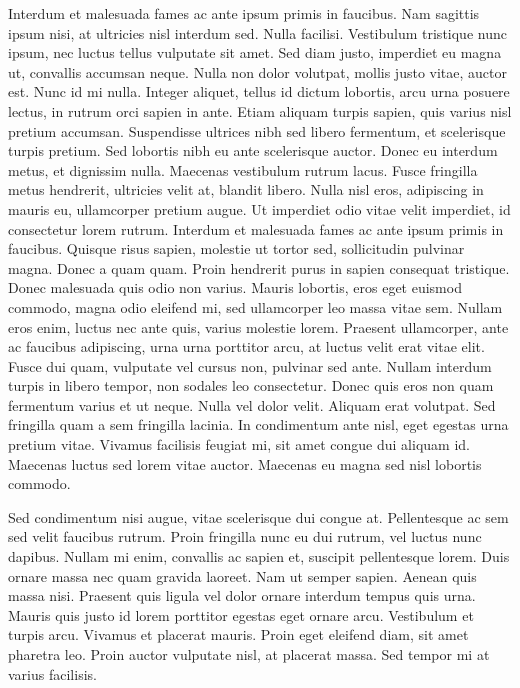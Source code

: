 \documentclass[a4paper, 12pt, twoside]{book}
\begin{document}

Interdum et malesuada fames ac ante ipsum primis in faucibus. Nam sagittis ipsum nisi, at ultricies nisl interdum sed. Nulla facilisi. Vestibulum tristique nunc ipsum, nec luctus tellus vulputate sit amet. Sed diam justo, imperdiet eu magna ut, convallis accumsan neque. Nulla non dolor volutpat, mollis justo vitae, auctor est. Nunc id mi nulla. Integer aliquet, tellus id dictum lobortis, arcu urna posuere lectus, in rutrum orci sapien in ante. Etiam aliquam turpis sapien, quis varius nisl pretium accumsan. Suspendisse ultrices nibh sed libero fermentum, et scelerisque turpis pretium. Sed lobortis nibh eu ante scelerisque auctor. Donec eu interdum metus, et dignissim nulla. Maecenas vestibulum rutrum lacus. Fusce fringilla metus hendrerit, ultricies velit at, blandit libero. Nulla nisl eros, adipiscing in mauris eu, ullamcorper pretium augue. Ut imperdiet odio vitae velit imperdiet, id consectetur lorem rutrum. Interdum et malesuada fames ac ante ipsum primis in faucibus. Quisque risus sapien, molestie ut tortor sed, sollicitudin pulvinar magna. Donec a quam quam. Proin hendrerit purus in sapien consequat tristique. Donec malesuada quis odio non varius. Mauris lobortis, eros eget euismod commodo, magna odio eleifend mi, sed ullamcorper leo massa vitae sem. Nullam eros enim, luctus nec ante quis, varius molestie lorem. Praesent ullamcorper, ante ac faucibus adipiscing, urna urna porttitor arcu, at luctus velit erat vitae elit. Fusce dui quam, vulputate vel cursus non, pulvinar sed ante. Nullam interdum turpis in libero tempor, non sodales leo consectetur. Donec quis eros non quam fermentum varius et ut neque. Nulla vel dolor velit. Aliquam erat volutpat. Sed fringilla quam a sem fringilla lacinia. In condimentum ante nisl, eget egestas urna pretium vitae. Vivamus facilisis feugiat mi, sit amet congue dui aliquam id. Maecenas luctus sed lorem vitae auctor. Maecenas eu magna sed nisl lobortis commodo.

Sed condimentum nisi augue, vitae scelerisque dui congue at. Pellentesque ac sem sed velit faucibus rutrum. Proin fringilla nunc eu dui rutrum, vel luctus nunc dapibus. Nullam mi enim, convallis ac sapien et, suscipit pellentesque lorem. Duis ornare massa nec quam gravida laoreet. Nam ut semper sapien. Aenean quis massa nisi. Praesent quis ligula vel dolor ornare interdum tempus quis urna. Mauris quis justo id lorem porttitor egestas eget ornare arcu. Vestibulum et turpis arcu. Vivamus et placerat mauris. Proin eget eleifend diam, sit amet pharetra leo. Proin auctor vulputate nisl, at placerat massa. Sed tempor mi at varius facilisis.
\end{document}
